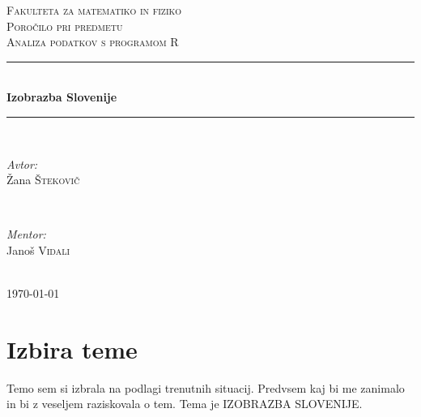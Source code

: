 \documentclass[11pt,a4paper]{article}
\begin{document}
\begin{titlepage} 

 
\newcommand{\HRule}{\rule{\linewidth}{0.5mm}} 

 
\center 

 
 \textsc{\LARGE Fakulteta za matematiko in fiziko}\\[1.5cm] 
 \textsc{\Large Poročilo pri predmetu}\\[0.5cm] 
 \textsc{\large Analiza podatkov s programom R}\\[0.5cm] 
 \HRule \\[0.4cm] 
 { \huge \bfseries Izobrazba Slovenije}\\[0.4cm]  
 \HRule \\[1.5cm]  
 
 
 
\begin{minipage}{0.4\textwidth} 
\begin{flushleft} \large 
\emph{Avtor:}\\ 
Žana \textsc{Štekovič} 
\end{flushleft} 
\end{minipage} 
~ 
\begin{minipage}{0.4\textwidth} 
\begin{flushright} \large 
\emph{Mentor:} \\ 
Janoš \textsc{Vidali} 
\end{flushright} 
\end{minipage}\\[4cm] 
 
 
{\large \today}\\[3cm]  
\vfill 
 
 
\end{titlepage} 


\section{Izbira teme}
Temo sem si izbrala na podlagi trenutnih situacij. Predvsem kaj bi me zanimalo in bi z veseljem raziskovala o tem.
Tema je IZOBRAZBA SLOVENIJE. 
\end{document}

